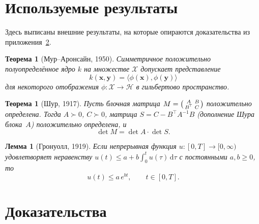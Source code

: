 \documentclass[14pt, a4paper]{extarticle}
\theoremstyle{definition}
\theoremstyle{plain}
\newtheorem{theorem}[definition]{Теорема}
\newtheorem{lemma}[definition]{Лемма}
\begin{document}
\newpage
\appendix
\section{Используемые результаты}
\label{app:used}

Здесь выписаны внешние результаты, на которые опираются доказательства из
приложения~\ref{app:proofs}.

\begin{theorem}[Мур--Аронсайн, 1950]
\label{res:aronszajn}
Симметричное положительно полуопределённое ядро $k$ на множестве $\mathcal{X}$
допускает представление~\cite{Aronszajn1950}
\[
    k(\mathbf{x},\mathbf{y})=\langle\phi(\mathbf{x}),\phi(\mathbf{y})\rangle
\]
для некоторого отображения $\phi:\mathcal{X}\to\mathcal{H}$ в гильбертово
пространство.
\end{theorem}

\begin{theorem}[Шур, 1917]
\label{res:schur}
Пусть блочная матрица $M=\begin{psmallmatrix}A&B\\ B^{\!\top}&C\end{psmallmatrix}$
положительно определена. Тогда $A\succ0$, $C\succ0$, матрица
$S=C-B^{\!\top}A^{-1}B$ (\emph{дополнение Шура} блока~$A$) положительно
определена, и~\cite[\S7.8]{HornJohnson2013}
\[
    \det M=\det A\cdot\det S .
\]
\end{theorem}

\begin{lemma}[Гронуолл, 1919]
\label{res:gronwall}
Если непрерывная функция $u:[0,T]\to[0,\infty)$ удовлетворяет неравенству
$u(t)\le a+b\int_0^t u(\tau)\,\mathrm{d}\tau$ с постоянными $a,b\ge0$,
то~\cite[гл.~2]{Teschl2012}
\[
    u(t)\le a\,e^{bt},\qquad t\in[0,T].
\]
\end{lemma}

\section{Доказательства}
\label{app:proofs}
\end{document}
